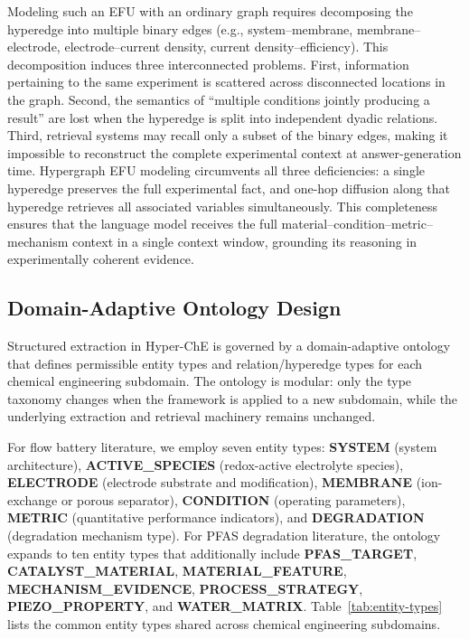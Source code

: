 \documentclass[11pt,a4paper]{article}
\begin{document}
Modeling such an EFU with an ordinary graph requires decomposing the hyperedge into multiple binary edges (e.g., system--membrane, membrane--electrode, electrode--current density, current density--efficiency). This decomposition induces three interconnected problems. First, information pertaining to the same experiment is scattered across disconnected locations in the graph. Second, the semantics of ``multiple conditions jointly producing a result'' are lost when the hyperedge is split into independent dyadic relations. Third, retrieval systems may recall only a subset of the binary edges, making it impossible to reconstruct the complete experimental context at answer-generation time. Hypergraph EFU modeling circumvents all three deficiencies: a single hyperedge preserves the full experimental fact, and one-hop diffusion along that hyperedge retrieves all associated variables simultaneously. This completeness ensures that the language model receives the full material--condition--metric--mechanism context in a single context window, grounding its reasoning in experimentally coherent evidence.

\subsection{Domain-Adaptive Ontology Design}
\label{subsec:ontology}

Structured extraction in Hyper-ChE is governed by a domain-adaptive ontology that defines permissible entity types and relation/hyperedge types for each chemical engineering subdomain. The ontology is modular: only the type taxonomy changes when the framework is applied to a new subdomain, while the underlying extraction and retrieval machinery remains unchanged.

For flow battery literature, we employ seven entity types: \textbf{SYSTEM} (system architecture), \textbf{ACTIVE\_SPECIES} (redox-active electrolyte species), \textbf{ELECTRODE} (electrode substrate and modification), \textbf{MEMBRANE} (ion-exchange or porous separator), \textbf{CONDITION} (operating parameters), \textbf{METRIC} (quantitative performance indicators), and \textbf{DEGRADATION} (degradation mechanism type). For PFAS degradation literature, the ontology expands to ten entity types that additionally include \textbf{PFAS\_TARGET}, \textbf{CATALYST\_MATERIAL}, \textbf{MATERIAL\_FEATURE}, \textbf{MECHANISM\_EVIDENCE}, \textbf{PROCESS\_STRATEGY}, \textbf{PIEZO\_PROPERTY}, and \textbf{WATER\_MATRIX}. Table~\ref{tab:entity-types} lists the common entity types shared across chemical engineering subdomains.
\end{document}
